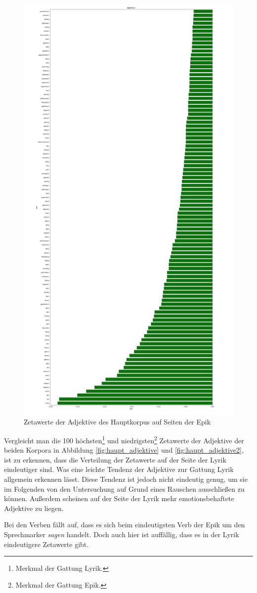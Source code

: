 \documentclass[a4paper,10p]{article}
\begin{document}
\begin{figure}{}
\begin{minipage}[b]{.45\linewidth}
        \includegraphics[width=.6\linewidth]{haupt_adjektive_pro_wort2.png}
        \caption{Zetawerte der Adjektive des Hauptkorpus  auf Seiten der Epik}
        \label{haupt_adjektive2}
    \end{minipage}
\end{figure}


Vergleicht man die 100 höchsten\footnote{Merkmal der Gattung Lyrik.} und niedrigsten\footnote{Merkmal der Gattung Epik.} Zetawerte der Adjektive der beiden Korpora in Abbildung \ref{fig:haupt_adjektive} und \ref{fig:haupt_adjektive2}, ist zu erkennen, dass die Verteilung der Zetawerte auf der Seite der Lyrik eindeutiger sind. Was eine leichte Tendenz der Adjektive zur Gattung Lyrik allgemein erkennen lässt. Diese Tendenz ist jedoch nicht eindeutig genug, um sie im Folgenden von den Untersuchung auf Grund eines Rauschen ausschließen zu können. Außerdem scheinen auf der Seite der Lyrik mehr emotionsbehaftete Adjektive zu liegen. \par 
\newpage

Bei den Verben fällt auf, dass es sich beim eindeutigsten Verb der Epik um den Sprechmarker \textit{sagen} handelt. Doch auch hier ist auffällig, dass es in der Lyrik eindeutigere Zetawerte gibt.  \par 
\end{document}
